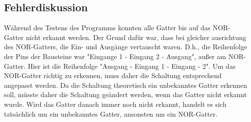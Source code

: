 \subsection{Fehlerdiskussion}
\label{subsec:a3-fehlerdiskussion}

Während des Testens des Programms konnten alle Gatter bis auf das NOR-Gatter nicht erkannt werden.
Der Grund dafür war, dass bei gleicher ausrichtung des NOR-Gatters, die Ein- und Ausgänge vertauscht waren.
D.h., die Reihenfolge der Pins der Bausteine war "Eingange 1 - Eingang 2 - Ausgang", außer am NOR-Gatter.
Hier ist die Reihenfolge "Ausgang - Eingang 1 - Eingang - 2".
Um das NOR-Gatter richtig zu erkennen, muss daher die Schaltung entsprechend angepasst werden.
Da die Schaltung theoretisch ein unbekanntes Gatter erkennen soll, müsste daher die Schaltung geändert werden, wenn das Gatter nicht erkannt wurde.
Wird das Gatter danach immer noch nicht erkannt, handelt es sich tatsächlich um ein unbekanntes Gatter, ansonsten um ein NOR-Gatter.
